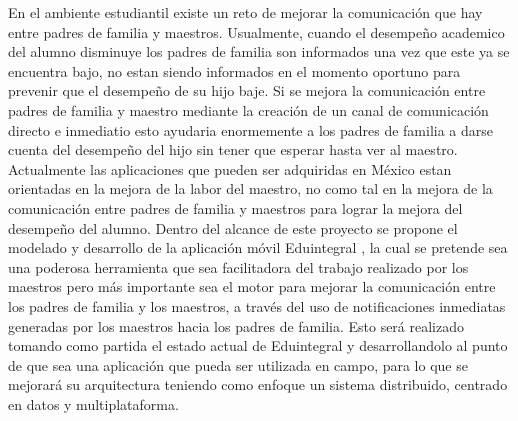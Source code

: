 
En el ambiente estudiantil existe un reto de mejorar la comunicación que hay entre padres de familia y maestros. Usualmente, cuando el desempeño academico del alumno disminuye los padres de familia son informados una vez que este ya se encuentra bajo, no estan siendo informados en el momento oportuno para prevenir que el desempeño de su hijo baje. Si se mejora la comunicación entre padres de familia y maestro mediante la creación de un canal de comunicación directo e inmediatio esto ayudaria enormemente a los padres de familia a darse cuenta del desempeño del hijo sin tener que esperar hasta ver al maestro. Actualmente las aplicaciones que pueden ser adquiridas en México estan orientadas en la mejora de la labor del maestro, no como tal en la mejora de la comunicación entre padres de familia y maestros para lograr la mejora del desempeño del alumno. Dentro del alcance de este proyecto se propone el modelado y desarrollo de la aplicación móvil Eduintegral \cite{eduintegral}, la cual se pretende sea una poderosa herramienta que sea facilitadora del trabajo realizado por los maestros pero más importante sea el motor para mejorar la comunicación entre los padres de familia y los maestros, a través del uso de notificaciones inmediatas generadas por los maestros hacia los padres de familia. Esto será realizado tomando como partida el estado actual de Eduintegral \cite{eduintegral} y desarrollandolo al punto de que sea una aplicación que pueda ser utilizada en campo, para lo que se mejorará su arquitectura teniendo como enfoque un sistema distribuido, centrado en datos y multiplataforma.